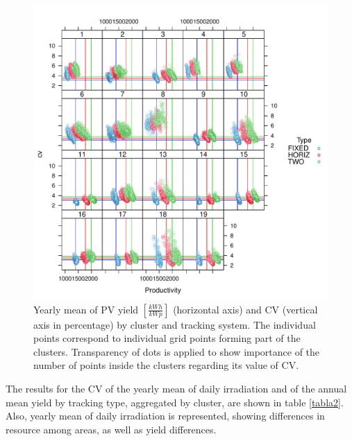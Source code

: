 \begin{subappendices}
\begin{figure}[!tbp]
  \includegraphics[width=\textwidth]{figs/capitulo5/Yearlycv_productivity3.pdf}
  \caption{Yearly mean of PV yield $[\frac{kWh}{kWp}]$ (horizontal axis) and CV (vertical axis in percentage) by cluster and tracking system. The individual points correspond to individual grid points forming part of the clusters. Transparency of dots is applied to show importance of the number of points inside the clusters regarding its value of CV.}
  \label{yearly_productivity_and_CV}
\end{figure}


The results for the CV of the yearly mean of daily irradiation and of the annual mean yield by tracking type, aggregated by cluster, are shown in table \ref{tabla2}. Also, yearly mean of daily irradiation is represented, showing differences in resource among areas, as well as yield differences.


\end{subappendices}
